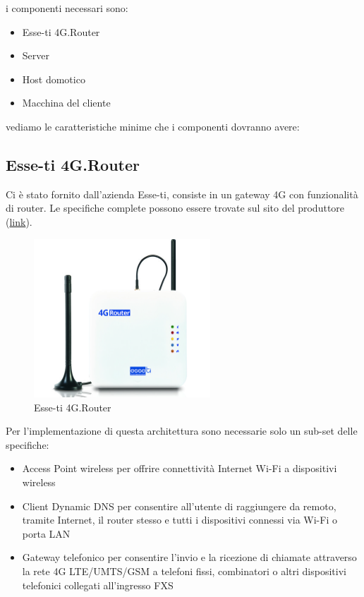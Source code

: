 i componenti necessari sono:

\begin{itemize}
	\item Esse-ti 4G.Router
	\item Server
	\item Host domotico
	\item Macchina del cliente
\end{itemize}

vediamo le caratteristiche minime che i componenti dovranno avere:

\subsection{Esse-ti 4G.Router}

Ci è stato fornito dall'azienda Esse-ti, consiste in un gateway 4G con funzionalità di router. Le specifiche complete possono essere trovate sul sito del produttore (\href{https://www.esse-ti.it/4g-router}{link}).


\begin{figure}[ht]
	\centering
	\includegraphics[width=250px]{immagini/4grouter.jpg}
	\caption{Esse-ti 4G.Router}
	\label{fig:esse-ti-router-4g}
\end{figure}

Per l'implementazione di questa architettura sono necessarie solo un sub-set delle specifiche:

\begin{itemize}
	\item Access Point wireless per offrire connettività Internet Wi-Fi a dispositivi wireless
	\item Client Dynamic DNS per consentire all’utente di raggiungere da remoto, tramite Internet, il router stesso e tutti i dispositivi connessi via Wi-Fi o porta LAN
	\item Gateway telefonico per consentire l’invio e la ricezione di chiamate attraverso la rete 4G LTE/UMTS/GSM a telefoni fissi, combinatori o altri dispositivi telefonici collegati all’ingresso FXS
\end{itemize}

